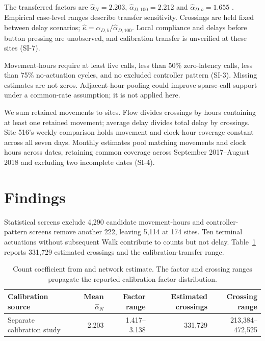 \documentclass[11pt]{article}
\begin{document}
The transferred factors are $\widehat\alpha_N=2.203$, $\widehat\alpha_{D,100}=2.212$ and $\widehat\alpha_{D,b}=1.655$ \citep{levinson2026firstActuationCalibration}. Empirical case-level ranges describe transfer sensitivity. Crossings are held fixed between delay scenarios; $\widehat\kappa=\widehat\alpha_{D,b}/\widehat\alpha_{D,100}$. Local compliance and delays before button pressing are unobserved, and calibration transfer is unverified at these sites (SI-7).

Movement-hours require at least five calls, less than 50\% zero-latency calls, less than 75\% no-actuation cycles, and no excluded controller pattern (SI-3). Missing estimates are not zeros. Adjacent-hour pooling could improve sparse-call support under a common-rate assumption; it is not applied here.

We sum retained movements to sites. Flow divides crossings by hours containing at least one retained movement; average delay divides total delay by crossings. Site 516's weekly comparison holds movement and clock-hour coverage constant across all seven days. Monthly estimates pool matching movements and clock hours across dates, retaining common coverage across September 2017--August 2018 and excluding two incomplete dates (SI-4).

\section{Findings}

Statistical screens exclude 4,290 candidate movement-hours and controller-pattern screens remove another 222, leaving 5,114 at 174 sites. Ten terminal actuations without subsequent Walk contribute to counts but not delay. Table~\ref{tab:counts} reports 331,729 estimated crossings and the calibration-transfer range.

\begin{table}[htbp]
\centering
\caption{Count coefficient from \citet{levinson2026firstActuationCalibration} and network estimate. The factor and crossing ranges propagate the reported calibration-factor distribution.}
\label{tab:counts}
\footnotesize
\setlength{\tabcolsep}{4pt}
\begin{tabular}{@{}lrrrr@{}}
\toprule
Calibration source & Mean $\widehat\alpha_N$ & Factor range & Estimated crossings & Crossing range \\
\midrule
Separate calibration study & 2.203 & 1.417--3.138 & 331{,}729 & 213{,}384--472{,}525 \\
\bottomrule
\end{tabular}
\end{table}
\end{document}
